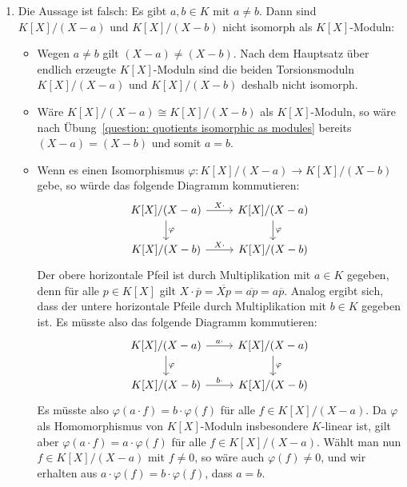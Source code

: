 \begin{solution}
\begin{enumerate}
    \item
      Die Aussage ist falsch:
      Es gibt $a, b \in K$ mit $a \neq b$.
      Dann sind $K[X]/(X-a)$ und $K[X]/(X-b)$ nicht isomorph als $K[X]$-Moduln:
      \begin{itemize}
        \item
          Wegen $a \neq b$ gilt $(X-a) \neq (X-b)$.
          Nach dem Hauptsatz über endlich erzeugte $K[X]$-Moduln sind die beiden Torsionsmoduln $K[X]/(X-a)$ und $K[X]/(X-b)$ deshalb nicht isomorph.
        \item
          Wäre $K[X]/(X-a) \cong K[X]/(X-b)$ als $K[X]$-Moduln, so wäre nach Übung~\ref{question: quotients isomorphic as modules} bereits $(X-a) = (X-b)$ und somit $a = b$.
        \item
          Wenn es einen Isomorphismus $\varphi \colon K[X]/(X-a) \to K[X]/(X-b)$ gebe, so würde das folgende Diagramm kommutieren:
          \[
            \begin{tikzcd}[ampersand replacement = \&]
                  K[X]/(X-a)
                  \arrow{r}{X \cdot}
                  \arrow{d}{\varphi}
              \&  K[X]/(X-a)
                  \arrow{d}{\varphi}
              \\
                  K[X]/(X-b)
                  \arrow{r}{X \cdot}
              \&  K[X]/(X-b)
            \end{tikzcd}
          \]
          Der obere horizontale Pfeil ist durch Multiplikation mit $a \in K$ gegeben, denn für alle $p \in K[X]$ gilt $X \cdot \overline{p} = \overline{Xp} = \overline{ap} = a \overline{p}$.
          Analog ergibt sich, dass der untere horizontale Pfeile durch Multiplikation mit $b \in K$ gegeben ist.
          Es müsste also das folgende Diagramm kommutieren:
          \[
            \begin{tikzcd}[ampersand replacement = \&]
                  K[X]/(X-a)
                  \arrow{r}{a \cdot}
                  \arrow{d}{\varphi}
              \&  K[X]/(X-a)
                  \arrow{d}{\varphi}
              \\
                  K[X]/(X-b)
                  \arrow{r}{b \cdot}
              \&  K[X]/(X-b)
            \end{tikzcd}
          \]
          Es müsste also $\varphi(a \cdot f) = b \cdot \varphi(f)$ für alle $f \in K[X]/(X-a)$.
          Da $\varphi$ als Homomorphismus von $K[X]$-Moduln insbesondere $K$-linear ist, gilt aber $\varphi(a \cdot f) = a \cdot \varphi(f)$ für alle $f \in K[X]/(X-a)$.
          Wählt man nun $f \in K[X]/(X-a)$ mit $f \neq 0$, so wäre auch $\varphi(f) \neq 0$, und wir erhalten aus $a \cdot \varphi(f) = b \cdot \varphi(f)$, dass $a = b$.
      \end{itemize}
      

\end{enumerate}
\end{solution}
